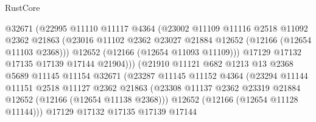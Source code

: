 \begin{lexlean}{RustCore}
\begin{coremodule}
                                @32671
                                (@22995
                                  @11110
                                  @11117
                                  @4364
                                  (@23002
                                    @11109
                                    @11116
                                    @2518
                                    @11092
                                    @2362
                                    @21863
                                    (@23016
                                      @11102
                                      @2362
                                      @23027
                                      @21884
                                      @12652
                                      (@12166 (@12654 @11103 @2368)))
                                    @12652
                                    (@12166 (@12654 @11093 @11109)))
                                  @17129
                                  @17132
                                  @17135
                                  @17139
                                  @17144
                                  @21904)))
                            (@21910
                              @11121
                              @682
                              @1213
                              @13
                              @2368
                              @5689
                              @11145
                              @11154
                              @32671
                              (@23287
                                @11145
                                @11152
                                @4364
                                (@23294
                                  @11144
                                  @11151
                                  @2518
                                  @11127
                                  @2362
                                  @21863
                                  (@23308
                                    @11137
                                    @2362
                                    @23319
                                    @21884
                                    @12652
                                    (@12166 (@12654 @11138 @2368)))
                                  @12652
                                  (@12166 (@12654 @11128 @11144)))
                                @17129
                                @17132
                                @17135
                                @17139
                                @17144

\end{coremodule}
\end{lexlean}
